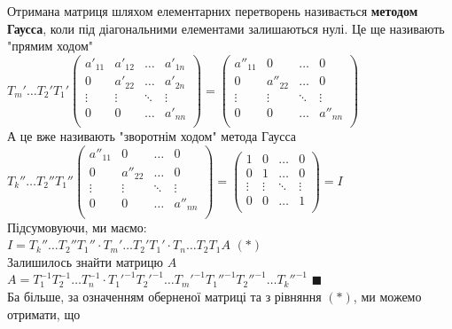 \documentclass[a4paper, 10pt]{article}
\def\qed{$\blacksquare$}
\theoremstyle{theoremdd}
\theoremstyle{theoremdd}
\theoremstyle{theoremdd}
\theoremstyle{theoremdd}
\theoremstyle{theoremdd}
\theoremstyle{theoremdd}
\theoremstyle{theoremdd}
\theoremstyle{theoremdd}
\begin{document}
	Отримана матриця шляхом елементарних перетворень називається \textbf{методом Гаусса}, коли під діагональними елементами залишаються нулі. Це ще називають "прямим ходом"\\
	$T_m' \dots T_2' T_1' \begin{pmatrix}
	a'_{11} & a'_{12} & \dots & a'_{1n} \\
	0 & a'_{22} & \dots & a'_{2n} \\
	\vdots & \vdots & \ddots & \vdots \\
	0 & 0 & \dots & a'_{nn} \\
	\end{pmatrix} = \begin{pmatrix}
	a''_{11} & 0 & \dots & 0 \\
	0 & a''_{22} & \dots & 0 \\
	\vdots & \vdots & \ddots & \vdots \\
	0 & 0 & \dots & a''_{nn} \\
	\end{pmatrix}$\\
	А це вже називають "зворотнім ходом" \textrm{} метода Гаусса\\
	$T_k''\dots T_2'' T_1'' \begin{pmatrix}
	a''_{11} & 0 & \dots & 0 \\
	0 & a''_{22} & \dots & 0 \\
	\vdots & \vdots & \ddots & \vdots \\
	0 & 0 & \dots & a''_{nn} \\
	\end{pmatrix} = \begin{pmatrix}
	1 & 0 & \dots & 0 \\
	0 & 1 & \dots & 0 \\
	\vdots & \vdots & \ddots & \vdots \\
	0 & 0 & \dots & 1 \\
	\end{pmatrix} = I$\\
	Підсумовуючи, ми маємо:\\
	$I = T_k'' \dots T_2'' T_1'' \cdot T_m' \dots T_2' T_1' \cdot T_n \dots T_2 T_1 A$ $(*)$\\
	Залишилось знайти матрицю $A$\\
	$A = T_1^{-1} T_2^{-1} \dots T_n^{-1} \cdot T_1'^{-1} T_2'^{-1} \dots T_m'^{-1} T_1''^{-1} T_2''^{-1} \dots T_k''^{-1}$
	\qed
	\bigskip \\
	Ба більше, за означенням оберненої матриці та з рівняння $(*)$, ми можемо отримати, що\\
\end{document}

